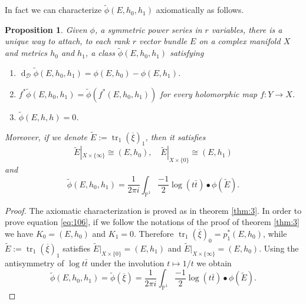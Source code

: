 \documentclass[10pt,twoside]{article}
\numberwithin{equation}{section}
\theoremstyle{plain}
\newtheorem{proposition}[equation]{Proposition}
\theoremstyle{definition}
\DeclareMathOperator{\tr}{tr}
\DeclareMathOperator{\dd}{d}
\begin{document}
In fact we can characterize $\widetilde \phi (E,h_{0},h_{1})$
axiomatically as follows.

\begin{proposition} \label{prop:18}
  Given $\phi$, a symmetric power series in $r$
  variables, 
  there is a unique way to attach, to each rank $r$ vector bundle $E$
  on a complex manifold $X$ and
  metrics $h_{0}$ and $h_{1}$, a class $\widetilde
  {\phi}(E,h_{0},h_{1})$ satisfying
  \begin{enumerate}
  \item $\dd_{\mathcal{D}}\widetilde \phi (E,h_{0},h_{1})=\phi (E,h_{0})-\phi
    (E,h_{1})$.
  \item $f^{\ast}\widetilde \phi (E,h_{0},h_{1})=\widetilde \phi
    (f^{\ast}(E,h_{0},h_{1}))$ for every holomorphic map
    $f\colon Y\longrightarrow X$.
  \item $\widetilde \phi (E,h,h)=0$.
  \end{enumerate}
  Moreover, if we denote $\widetilde E:=\tr_{1}(\overline 
  \xi)_{1}$, then it satisfies
  \begin{displaymath}
    \widetilde E|_{X\times\{\infty\}}\cong (E,h_{0}),\quad
    \widetilde E|_{X\times\{0\}}\cong (E,h_{1})
  \end{displaymath}
  and
  \begin{equation}\label{eq:106}
    \widetilde \phi (E,h_{0},h_{1})=
 \frac{1}
  {2\pi
    i}\int_{\mathbb{P}^{1}}\frac{-1}{2}\log(t\bar{t}) \bullet 
  \phi(\widetilde E).
  \end{equation}
\end{proposition}
\begin{proof}
  The axiomatic characterization is proved as in theorem
  \ref{thm:3}. In order to prove equation \eqref{eq:106},
  if we follow the notations of the proof of theorem \ref{thm:3} we
  have $K_{0}=(E,h_{0})$ and $K_{1}=0$. Therefore $\tr_{1}(\overline
  \xi)_{0}=p_{1}^{\ast}(E,h_{0})$, while $\widetilde
  E:=\tr_{1}(\overline 
  \xi)_{1}$ satisfies $\widetilde E|_{X\times \{0\}}=(E,h_{1})$ and
  $\widetilde E|_{X\times \{\infty\}}=(E,h_{0})$. Using the antisymmetry
  of $\log t\bar t$ under the involution $t\mapsto 1/t$ we obtain
  \begin{displaymath}
    \widetilde \phi (E,h_{0},h_{1})=\widetilde {\phi }(\overline{\xi})=
 \frac{1}
  {2\pi
    i}\int_{\mathbb{P}^{1}}\frac{-1}{2}\log(t\bar{t}) \bullet 
  \phi(\widetilde E).
  \end{displaymath}  
\end{proof}
\end{document}
